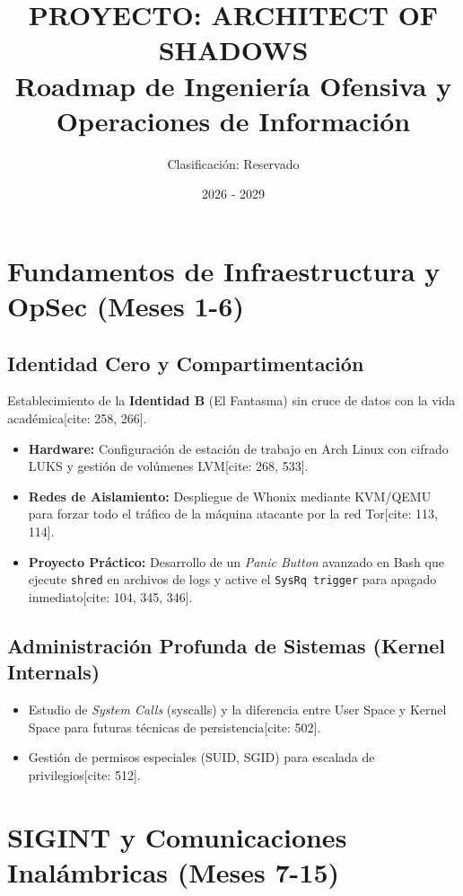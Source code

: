 \documentclass[11pt,a4paper]{report}
\begin{document}
	
	\title{\textbf{PROYECTO: ARCHITECT OF SHADOWS}\\ \large Roadmap de Ingeniería Ofensiva y Operaciones de Información}
	\author{Clasificación: Reservado}
	\date{2026 - 2029}
	\maketitle
	
	\tableofcontents
	
	\chapter{Fundamentos de Infraestructura y OpSec (Meses 1-6)}
	
	\section{Identidad Cero y Compartimentación}
	Establecimiento de la \textbf{Identidad B} (El Fantasma) sin cruce de datos con la vida académica[cite: 258, 266].
	\begin{itemize}
		\item \textbf{Hardware:} Configuración de estación de trabajo en Arch Linux con cifrado LUKS y gestión de volúmenes LVM[cite: 268, 533].
		\item \textbf{Redes de Aislamiento:} Despliegue de Whonix mediante KVM/QEMU para forzar todo el tráfico de la máquina atacante por la red Tor[cite: 113, 114].
		\item \textbf{Proyecto Práctico:} Desarrollo de un \textit{Panic Button} avanzado en Bash que ejecute \texttt{shred} en archivos de logs y active el \texttt{SysRq trigger} para apagado inmediato[cite: 104, 345, 346].
	\end{itemize}
	
	\section{Administración Profunda de Sistemas (Kernel Internals)}
	\begin{itemize}
		\item Estudio de \textit{System Calls} (syscalls) y la diferencia entre User Space y Kernel Space para futuras técnicas de persistencia[cite: 502].
		\item Gestión de permisos especiales (SUID, SGID) para escalada de privilegios[cite: 512].
	\end{itemize}
	
	\chapter{SIGINT y Comunicaciones Inalámbricas (Meses 7-15)}
	
\end{document}
